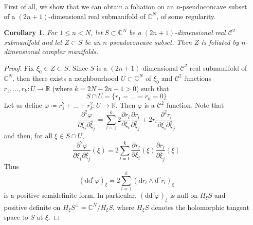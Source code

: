 \documentclass[reqno,oneside]{amsart}
\newcommand{\numberset}{\mathbb}
\newcommand{\R}{\numberset{R}}
\newcommand{\C}{\numberset{C}}
\renewcommand{\phi}{\varphi}
\newcommand{\ddc}{\mathrm{dd^c}}
\renewcommand{\d}{\mathrm{d}}
\newcommand{\dc}{\mathrm{d^c}}
\theoremstyle{definition}
\theoremstyle{plain}
\newtheorem{corollary}[definition]{Corollary}
\theoremstyle{remark}
\begin{document}
First of all, we show that we can obtain a foliation on an $n$-pseudoconcave subset of a $(2n+1)$-dimensional real submanifold of $\C^N$, of some regularity.
\begin{corollary}
\label{coro:submanifold}
    For $1\leq n<N$, let $S\subset\C^N$ be a $(2n+1)$-dimensional real $\mathscr{C}^2$ submanifold and let $Z\subset S$ be an $n$-pseudoconcave subset. Then $Z$ is foliated by $n$-dimensional complex manifolds.
\end{corollary}
\begin{proof}
    Fix $\xi_0\in Z\subset S$. Since $S$ is a $(2n+1)$-dimensional $\mathscr{C}^2$ real submanifold of $\C^N$, then there exists a neighbourhood $U\subset\C^N$ of $\xi_0$ and $\mathscr{C}^2$ functions $r_1,\dots,r_k:U\to\R$ (where $k=2N-2n-1>0$) such that
    \[
        S\cap U=\{r_1=\dots=r_k=0\}
    \]
    Let us define $\phi\coloneqq r_1^2+\dots+r_k^2:U\to\R$. Then $\phi$ is a $\mathscr{C}^2$ function. Note that
    \[
        \frac{\partial^2\phi}{\partial\xi_i\partial\bar\xi_j}=\sum_{l=1}^k2\frac{\partial r_l}{\partial\xi_i}\frac{\partial r_l}{\partial\bar\xi_j}+2r_l\frac{\partial^2 r_l}{\partial\xi_i\partial\bar\xi_j}
    \]
    and then, for all $\xi\in S\cap U$,
    \[
        \frac{\partial^2\phi}{\partial\xi_i\partial\bar\xi_j}(\xi)=2\sum_{l=1}^k\frac{\partial r_l}{\partial\xi_i}(\xi)\frac{\partial r_l}{\partial\bar\xi_j}(\xi)
    \]
    Thus
    \[
    	(\ddc\phi)_\xi=2\sum_{l=1}^k (\d r_l\wedge\dc r_l)_\xi
    \]
    is a positive semidefinite form. In particular, $(\ddc\phi)_\xi$ is null on $H_\xi S$ and positive definite on $H_\xi S^\perp=\C^N/H_\xi S$, where $H_\xi S$ denotes the holomorphic tangent space to $S$ at $\xi$. 
    

\end{proof}
\end{document}
